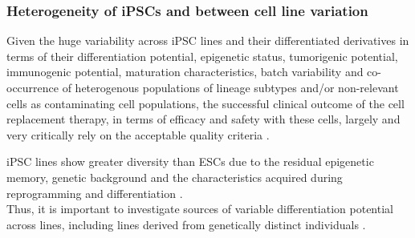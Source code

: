 




\subsubsection{Heterogeneity of iPSCs and between cell line variation}

Given the huge variability across iPSC lines and their differentiated derivatives in terms of their differentiation potential, epigenetic status, tumorigenic potential, immunogenic potential, maturation characteristics, batch variability and co-occurrence of heterogenous populations of lineage subtypes and/or non-relevant cells as contaminating cell populations, the successful clinical outcome of the cell replacement therapy, in terms of efficacy and safety with these cells, largely and very critically rely on the acceptable quality criteria \cite{buganim2013mechanisms}.

iPSC lines show greater diversity than ESCs due to the residual epigenetic memory, genetic background and the characteristics acquired during reprogramming and differentiation \cite{kim2010epigenetic, polo2010cell, rouhani2014genetic}.\\

Thus, it is important to investigate sources of variable differentiation potential across lines, including lines derived from genetically distinct individuals \cite{}.


